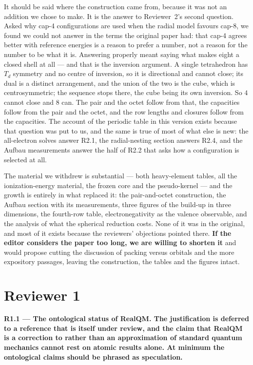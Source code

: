 \documentclass[11pt,a4paper]{article}
\begin{document}
It should be said where the construction came from, because it was not an addition we chose to
make. It is the answer to Reviewer~2's second question. Asked why cap-4 configurations are used
when the radial model favours cap-8, we found we could not answer in the terms the original paper
had: that cap-4 agrees better with reference energies is a reason to prefer a number, not a reason
for the number to be what it is. Answering properly meant saying what makes eight a closed shell at
all --- and that is the inversion argument. A single tetrahedron has $T_d$ symmetry and no centre of
inversion, so it is directional and cannot close; its dual is a distinct arrangement, and the union
of the two is the cube, which is centrosymmetric; the sequence stops there, the cube being its own
inversion. So $4$ cannot close and $8$ can. The pair and the octet follow from that, the capacities
follow from the pair and the octet, and the row lengths and closures follow from the capacities.
The account of the periodic table in this version exists because that question was put to us, and
the same is true of most of what else is new: the all-electron solves answer R2.1, the
radial-nesting section answers R2.4, and the Aufbau measurements answer the half of R2.2 that asks
how a configuration is selected at all.

The material we withdrew is substantial --- both heavy-element tables, all the ionization-energy
material, the frozen core and the pseudo-kernel --- and the growth is entirely in what replaced it: the
pair-and-octet construction, the Aufbau section with its measurements, three figures of the
build-up in three dimensions, the fourth-row table, electronegativity as the valence observable,
and the analysis of what the spherical reduction costs. None of it was in the original, and most of
it exists because the reviewers' objections pointed there. \textbf{If the editor considers the paper too
long, we are willing to shorten it} and would propose cutting the discussion of packing versus
orbitals and the more expository passages, leaving the construction, the tables and the figures
intact.

\section*{Reviewer 1}

\textbf{R1.1 --- The ontological status of RealQM. The justification is deferred to a reference that is
itself under review, and the claim that RealQM is a correction to rather than an approximation
of standard quantum mechanics cannot rest on atomic results alone. At minimum the ontological
claims should be phrased as speculation.}
\end{document}
